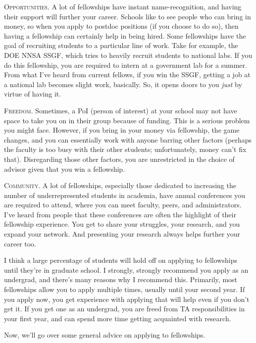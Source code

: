 \documentclass[12pt]{article}
\begin{document}
\textsc{Opportunities.} A lot of fellowships have instant name-recognition, and having their support will further your career. Schools like to see people who can bring in money, so when you apply to postdoc positions (if you choose to do so), then having a fellowship can certainly help in being hired. Some fellowships have the goal of recruiting students to a particular line of work. Take for example, the DOE NNSA SSGF, which tries to heavily recruit students to national labs. If you do this fellowship, you are required to intern at a government lab for a summer. From what I've heard from current fellows, if you win the SSGF, getting a job at a national lab becomes slight work, basically. So, it opens doors to you \textit{just} by virtue of having it.

\textsc{Freedom.} Sometimes, a PoI (person of interest) at your school may not have space to take you on in their group because of funding. This is a serious problem you might face. However, if you bring in your money via fellowship, the game changes, and you can essentially work with anyone barring other factors (perhaps the faculty is too busy with their other students; unfortunately, money can't fix that). Disregarding those other factors, you are unrestricted in the choice of advisor given that you win a fellowship.

\textsc{Community.} A lot of fellowships, especially those dedicated to increasing the number of underrepresented students in academia, have annual conferences you are required to attend, where you can meet faculty, peers, and administrators. I've heard from people that these conferences are often the highlight of their fellowship experience. You get to share your struggles, your research, and you expand your network. And presenting your research always helps further your career too.

I think a large percentage of students will hold off on applying to fellowships until they're in graduate school. I strongly, strongly recommend you apply as an undergrad, and there's many reasons why I recommend this. Primarily, most fellowships allow you to apply multiple times, usually until your second year. If you apply now, you get experience with applying that will help even if you don't get it. If you get one as an undergrad, you are freed from TA responsibilities in your first year, and can spend more time getting acquainted with research.

Now, we'll go over some general advice on applying to fellowships.
\end{document}
